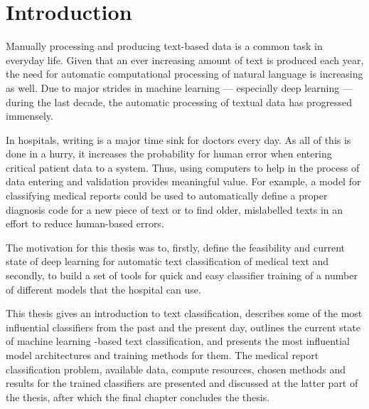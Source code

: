 \chapter{Introduction} \label{Introduction}

Manually processing and producing text-based data is a common task in everyday life.
Given that an ever increasing amount of text is produced each year, the need for automatic computational processing of natural language is increasing as well.
Due to major strides in machine learning --- especially deep learning --- during the last decade, the automatic processing of textual data has progressed immensely.



In hospitals, writing is a major time sink for doctors every day.
As all of this is done in a hurry, it increases the probability for human error when entering critical patient data to a system.
Thus, using computers to help in the process of data entering and validation provides meaningful value.
For example, a model for classifying medical reports could be used to automatically define a proper diagnosis code for a new piece of text or to find older, mislabelled texts in an effort to reduce human-based errors.

The motivation for this thesis was to, firstly, define the feasibility and current state of deep learning for automatic text classification of medical text and secondly, to build a set of tools for quick and easy classifier training of a number of different models that the hospital can use.

This thesis gives an introduction to text classification, describes some of the most influential classifiers from the past and the present day, outlines the current state of machine learning -based text classification, and presents the most influential model architectures and training methods for them.
The medical report classification problem, available data, compute resources, chosen methods and results for the trained classifiers are presented and discussed at the latter part of the thesis, after which the final chapter concludes the thesis.
